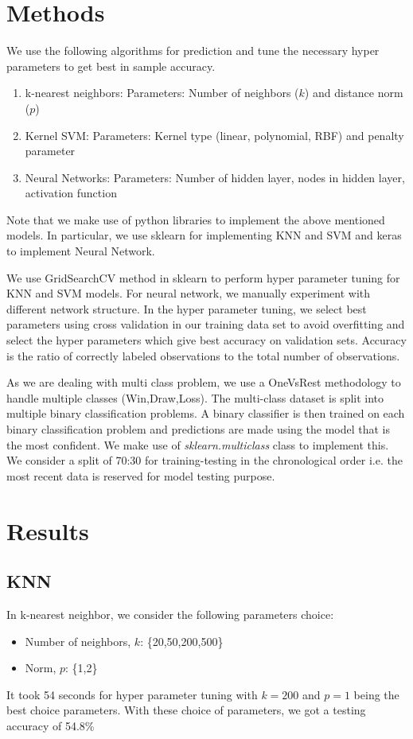 \documentclass{article}
\begin{document}
\section{Methods}
We use the following algorithms for prediction and tune the necessary hyper parameters to get best in sample accuracy.
\begin{enumerate}
	\item k-nearest neighbors: Parameters: Number of neighbors ($k$) and distance norm ($p$)
	\item Kernel SVM: Parameters: Kernel type (linear, polynomial, RBF) and penalty parameter
	\item Neural Networks: Parameters: Number of hidden layer, nodes in hidden layer, activation function
\end{enumerate}
Note that we make use of python libraries to implement the above mentioned models. In particular, we use sklearn for implementing KNN and SVM and keras to implement Neural Network.


We use GridSearchCV method in sklearn to perform hyper parameter tuning for KNN and SVM models. For neural network, we manually experiment with different network structure. In the hyper parameter tuning, we select best parameters using cross validation in our training data set to avoid overfitting and select the hyper parameters which give best accuracy on validation sets. Accuracy is the ratio of correctly labeled observations to the total number of observations. 


As we are dealing with multi class problem, we use a OneVsRest methodology to handle multiple classes (Win,Draw,Loss). The multi-class dataset is split into multiple binary classification problems. A binary classifier is then trained on each binary classification problem and predictions are made using the model that is the most confident. We make use of \textit{sklearn.multiclass} class to implement this.
We consider a split of 70:30 for training-testing in the chronological order i.e. the most recent data is reserved for model testing purpose.

\section{Results}
\subsection{KNN} In k-nearest neighbor, we consider the following parameters choice:
\begin{itemize}
	\item Number of neighbors, $k$: \{20,50,200,500\}
	\item Norm, $p$: \{1,2\}
\end{itemize}
It took 54 seconds for hyper parameter tuning with $k=200$ and $p=1$ being the best choice parameters. With these choice of parameters, we got a testing accuracy of 54.8\%
\end{document}
